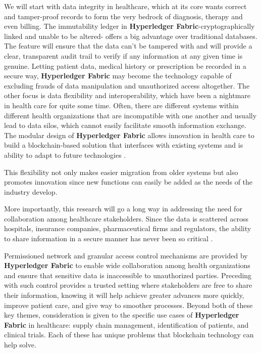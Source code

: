 We will start with data integrity in healthcare, which at its core wants correct and tamper-proof
records to form the very bedrock of diagnosis, therapy and even billing. The immutability ledger in 
\textbf{Hyperledger Fabric}-cryptographically linked and unable to be altered- offers a big advantage over 
traditional databases. The feature will ensure that the data can't be tampered with and will provide a clear, 
transparent audit trail to verify if any information at any given time is genuine. Letting patient data,
medical history or prescription be recorded in a secure way, \textbf{Hyperledger Fabric} may become the 
technology capable of excluding frauds of data manipulation and unauthorized access altogether. The other 
focus is data flexibility and interoperability, which have been a nightmare in health care for quite some time. 
Often, there are different systems within different health organizations that are incompatible with one another 
and usually lead to data silos, which cannot easily facilitate smooth information exchange. The modular design of 
\textbf{Hyperledger Fabric} allows innovation in health care to build a blockchain-based solution that interfaces 
with existing systems and is ability to adapt to future technologies \cite{data-integrity-healthcare}.

This flexibility not only makes easier migration from older systems but also promotes innovation since 
new functions can easily be added as the needs of the industry develop.

More importantly, this research will go a long way in addressing the need for collaboration
among healthcare stakeholders. Since the data is scattered across hospitals, insurance companies, 
pharmaceutical firms and regulators, the ability to share information in a secure manner has never been so 
critical \cite{multisectoral-healthcare}.

Permissioned network and granular access control 
mechanisms are provided by \textbf{Hyperledger Fabric} to enable wide 
collaboration among health organizations and ensure that sensitive data is inaccessible to 
unauthorized parties. Preceding with such control provides a trusted setting where stakeholders are free to 
share their information, knowing it will help achieve greater advances more quickly, improve patient care, and 
give way to smoother processes. Beyond both of these key themes, consideration is given to the specific use cases 
of \textbf{Hyperledger Fabric} in healthcare: supply chain management, identification of patients, and clinical 
trials. Each of these has unique problems that blockchain technology can help solve.

